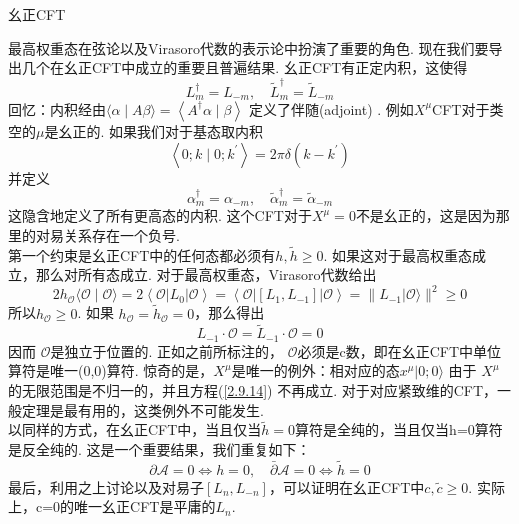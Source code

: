 \centerline{\Large 幺正CFT}
最高权重态在弦论以及Virasoro代数的表示论中扮演了重要的角色. 现在我们要导出几个在幺正CFT中成立的重要且普遍结果. 幺正CFT有正定内积，这使得
\begin{equation}
L_{m}^{\dagger}=L_{-m}, \quad \tilde{L}_{m}^{\dagger}=\tilde{L}_{-m}
\end{equation}
回忆：内积经由$\langle\alpha \mid A \beta\rangle=\left\langle A^{\dagger} \alpha \mid \beta\right\rangle$ 定义了伴随(adjoint) . 例如$X^\mu$CFT对于类空的$\mu$是幺正的. 如果我们对于基态取内积
\begin{equation}
\left\langle 0 ; k \mid 0 ; k^{\prime}\right\rangle=2 \pi \delta\left(k-k^{\prime}\right)
\end{equation}
并定义
\begin{equation}
\alpha_{m}^{\dagger}=\alpha_{-m}, \quad \tilde{\alpha}_{m}^{\dagger}=\tilde{\alpha}_{-m}
\end{equation}
这隐含地定义了所有更高态的内积. 这个CFT对于$X^\mu=0$不是幺正的，这是因为那里的对易关系存在一个负号. \\
第一个约束是幺正CFT中的任何态都必须有$h, \tilde{h} \geq 0$. 如果这对于最高权重态成立，那么对所有态成立. 对于最高权重态，Virasoro代数给出
\begin{equation}\label{2.9.14}
2 h_{\mathcal{O}}\langle\mathcal{O} \mid \mathcal{O}\rangle=2\left\langle\mathcal{O}\left|L_{0}\right| \mathcal{O}\right\rangle=\left\langle\mathcal{O}\left|\left[L_{1}, L_{-1}\right]\right| \mathcal{O}\right\rangle=\| L_{-1}|\mathcal{O}\rangle \|^{2} \geq 0
\end{equation}
所以$h_{\mathcal{O}} \geq 0 $. 如果 $h_{\mathcal{O}}=\tilde{h}_{\mathcal{O}}=0$，那么得出
\begin{equation}
L_{-1} \cdot \mathcal{O}=\tilde{L}_{-1} \cdot \mathcal{O}=0
\end{equation}
因而 $\mathcal{O}$是独立于位置的. 正如之前所标注的， $\mathcal{O}$必须是c数，即在幺正CFT中单位算符是唯一(0,0)算符. 惊奇的是，$X^\mu$是唯一的例外：相对应的态$x^{\mu}|0 ; 0\rangle$ 由于 $X^\mu$的无限范围是不归一的，并且方程(\ref{2.9.14}) 不再成立. 对于对应紧致维的CFT，一般定理是最有用的，这类例外不可能发生.\\
以同样的方式，在幺正CFT中，当且仅当$\tilde{h}=0$算符是全纯的，当且仅当h=0算符是反全纯的. 这是一个重要结果，我们重复如下：
\begin{equation}
\partial \mathscr{A}=0 \Leftrightarrow h=0, \quad \bar{\partial} \mathscr{A}=0 \Leftrightarrow \tilde{h}=0
\end{equation}
最后，利用之上讨论以及对易子$\left[L_{n}, L_{-n}\right]$，可以证明在幺正CFT中$c, \tilde{c} \geq 0$. 实际上，c=0的唯一幺正CFT是平庸的$L_n$. 

